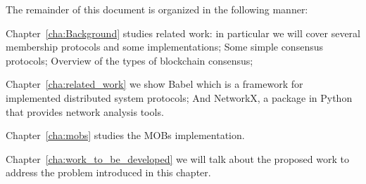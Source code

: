The remainder of this document is organized in the following manner:

Chapter~\ref{cha:Background} studies related work: in particular we will cover several membership protocols and some implementations;
Some simple consensus protocols; Overview of the types of blockchain consensus;


Chapter~\ref{cha:related_work} we show Babel which is a framework for implemented distributed system protocols; And NetworkX,
a package in Python that provides network analysis tools.

Chapter~\ref{cha:mobs} studies the MOBs implementation.

Chapter~\ref{cha:work_to_be_developed} we will talk about the proposed work to address the problem
introduced in this chapter.